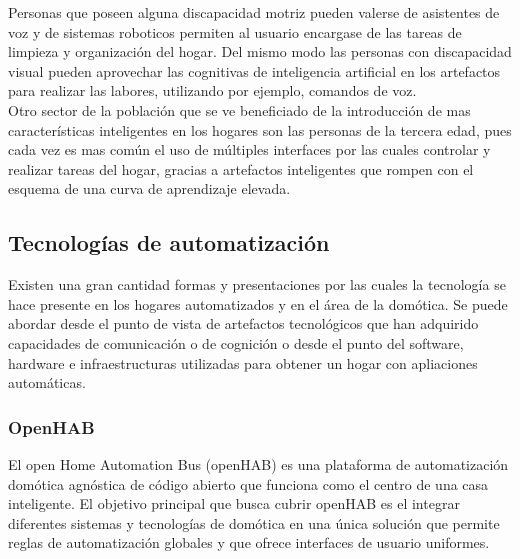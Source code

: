 Personas que poseen alguna discapacidad motriz pueden valerse de asistentes de voz y de sistemas roboticos permiten al usuario encargase de las tareas de limpieza y organización del hogar. Del mismo modo las personas con discapacidad visual pueden aprovechar las cognitivas de inteligencia artificial en los artefactos para realizar las labores, utilizando por ejemplo, comandos de voz.\\

Otro sector de la población que se ve beneficiado de la introducción de mas características inteligentes en los hogares son las personas de la tercera edad, pues cada vez es mas común el uso de múltiples interfaces por las cuales controlar y realizar tareas del hogar, gracias a artefactos inteligentes que rompen con el esquema de una curva de aprendizaje elevada. 

\subsection{Tecnologías de automatización}
Existen una gran cantidad formas y presentaciones por las cuales la tecnología se hace presente en los hogares automatizados y en el área de la domótica. Se puede abordar desde el punto de vista de artefactos tecnológicos que han adquirido capacidades de comunicación o de cognición o  desde el punto del software, hardware e infraestructuras utilizadas para obtener un hogar con apliaciones automáticas.

\subsubsection{OpenHAB}
El open Home Automation Bus (openHAB)\cite{openhabofficial} es una plataforma de automatización domótica agnóstica de código abierto que funciona como el centro de una casa inteligente.\cite{openhabdoc} El objetivo principal que busca cubrir openHAB es el integrar diferentes sistemas y tecnologías de domótica en una única solución que permite reglas de automatización globales y que ofrece interfaces de usuario uniformes.


